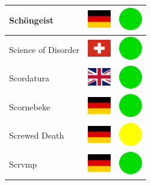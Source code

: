 \documentclass[12pt, a4paper, twoside]{report}
\begin{document}
\begin{center}
\begin{longtable}{|p{5cm}|p{2cm}|p{2cm}|}
 Schöngeist                                                 & \includegraphics[width=1cm]{../4x3/de} &   \includegraphics[width=1cm]{../likes/y} \\ \hline
 Science of Disorder                                        & \includegraphics[width=1cm]{../4x3/ch} &   \includegraphics[width=1cm]{../likes/y} \\ \hline
 Scordatura                                                 & \includegraphics[width=1cm]{../4x3/gb} &   \includegraphics[width=1cm]{../likes/y} \\ \hline
 Scornebeke                                                 & \includegraphics[width=1cm]{../4x3/de} &   \includegraphics[width=1cm]{../likes/y} \\ \hline
 Screwed Death                                              & \includegraphics[width=1cm]{../4x3/de} &   \includegraphics[width=1cm]{../likes/m} \\ \hline
 Scrvmp                                                     & \includegraphics[width=1cm]{../4x3/de} &   \includegraphics[width=1cm]{../likes/y} \\ \hline

\end{longtable}
\end{center}
\end{document}
